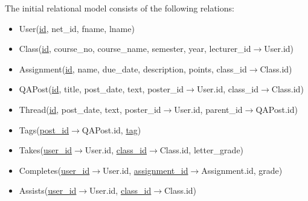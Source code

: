 \documentclass{paper}
\begin{document}
	The initial relational model consists of the following relations:
	\begin{itemize}
		\item User(\underline{id}, net\_id, fname, lname)
		\item Class(\underline{id}, course\_no, course\_name, semester, year, lecturer\_id$\to$User.id)
		\item Assignment(\underline{id}, name, due\_date, description, points, class\_id$\to$Class.id)
		\item QAPost(\underline{id}, title, post\_date, text, poster\_id$\to$User.id,  class\_id$\to$Class.id)
		\item Thread(\underline{id}, post\_date, text, poster\_id$\to$User.id, parent\_id$\to$QAPost.id)
		\item Tags(\underline{post\_id}$\to$QAPost.id, \underline{tag})
		\item Takes(\underline{user\_id}$\to$User.id, \underline{class\_id}$\to$Class.id, letter\_grade)
		\item Completes(\underline{user\_id}$\to$User.id, \underline{assignment\_id}$\to$Assignment.id, grade)
		\item Assists(\underline{user\_id}$\to$User.id, \underline{class\_id}$\to$Class.id)
	\end{itemize}
	
\end{document}
